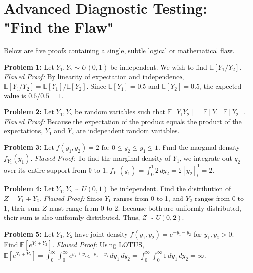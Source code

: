 \documentclass[11pt, a4paper]{article}
\theoremstyle{definition}
\theoremstyle{remark}
\newcommand{\E}{\mathbb{E}}
\begin{document}
\section{Advanced Diagnostic Testing: "Find the Flaw"}

Below are five proofs containing a single, subtle logical or mathematical flaw. 

\textbf{Problem 1:} Let $Y_1, Y_2 \sim U(0,1)$ be independent. We wish to find $\E[Y_1 / Y_2]$.
\textit{Flawed Proof:} By linearity of expectation and independence, $\E[Y_1 / Y_2] = \E[Y_1] / \E[Y_2]$. Since $\E[Y_1] = 0.5$ and $\E[Y_2] = 0.5$, the expected value is $0.5 / 0.5 = 1$.

\textbf{Problem 2:} Let $Y_1, Y_2$ be random variables such that $\E[Y_1 Y_2] = \E[Y_1]\E[Y_2]$.
\textit{Flawed Proof:} Because the expectation of the product equals the product of the expectations, $Y_1$ and $Y_2$ are independent random variables.

\textbf{Problem 3:} Let $f(y_1, y_2) = 2$ for $0 \leq y_2 \leq y_1 \leq 1$. Find the marginal density $f_{Y_1}(y_1)$.
\textit{Flawed Proof:} To find the marginal density of $Y_1$, we integrate out $y_2$ over its entire support from $0$ to $1$. $f_{Y_1}(y_1) = \int_0^1 2 \, dy_2 = 2[y_2]_0^1 = 2$.

\textbf{Problem 4:} Let $Y_1, Y_2 \sim U(0,1)$ be independent. Find the distribution of $Z = Y_1 + Y_2$.
\textit{Flawed Proof:} Since $Y_1$ ranges from 0 to 1, and $Y_2$ ranges from 0 to 1, their sum $Z$ must range from 0 to 2. Because both are uniformly distributed, their sum is also uniformly distributed. Thus, $Z \sim U(0,2)$.

\textbf{Problem 5:} Let $Y_1, Y_2$ have joint density $f(y_1, y_2) = e^{-y_1 - y_2}$ for $y_1, y_2 > 0$. Find $\E[e^{Y_1 + Y_2}]$.
\textit{Flawed Proof:} Using LOTUS, $\E[e^{Y_1 + Y_2}] = \int_0^\infty \int_0^\infty e^{y_1 + y_2} e^{-y_1 - y_2} \, dy_1 \, dy_2 = \int_0^\infty \int_0^\infty 1 \, dy_1 \, dy_2 = \infty$.

\vspace{10pt}
\hrule
\vspace{10pt}
\end{document}

